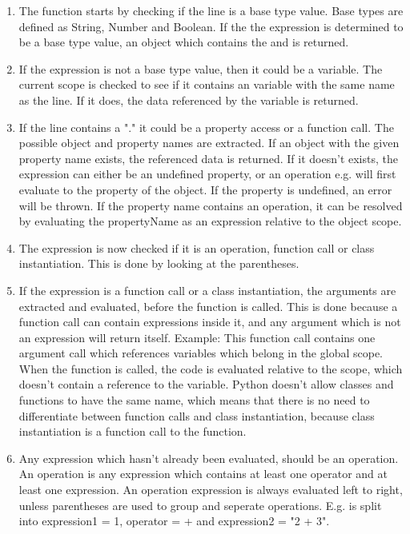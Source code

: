 \begin{enumerate}
    \item The function starts by checking if the line is a base type value. Base types are defined as String, Number and Boolean. If the the expression is determined to be a base type value, an object which contains the  and  is returned. 
    \item If the expression is not a base type value, then it could be a variable. The current scope is checked to see if it contains an variable with the same name as the line. If it does, the data referenced by the variable is returned.
    \item If the line contains a "." it could be a property access or a function call. The possible object and property names are extracted. If an object with the given property name exists, the referenced data is returned. If it doesn't exists, the expression can either be an undefined property, or an operation e.g.  will first evaluate to the property  of the  object. If the property is undefined, an error will be thrown. If the property name contains an operation, it can be resolved by evaluating the propertyName as an expression relative to the object scope.
    \item The expression is now checked if it is an operation, function call or class instantiation. This is done by looking at the parentheses.
    \item If the expression is a function call or a class instantiation, the arguments are extracted and evaluated, before the function is called. This is done because a function call can contain expressions inside it, and any argument which is not an expression will return itself. Example: This  function call contains one argument call which references variables which belong in the global scope. When the function is called, the code is evaluated relative to the  scope, which doesn't contain a reference to the  variable. Python doesn't allow classes and functions to have the same name, which means that there is no need to differentiate between function calls and class instantiation, because class instantiation is a function call to the  function.
    \item Any expression which hasn't already been evaluated, should be an operation. An operation is any expression which contains at least one operator and at least one expression. An operation expression is always evaluated left to right, unless parentheses are used to group and seperate operations. E.g.  is split into expression1 = 1, operator = + and expression2 = "2 + 3".
\end{enumerate}
